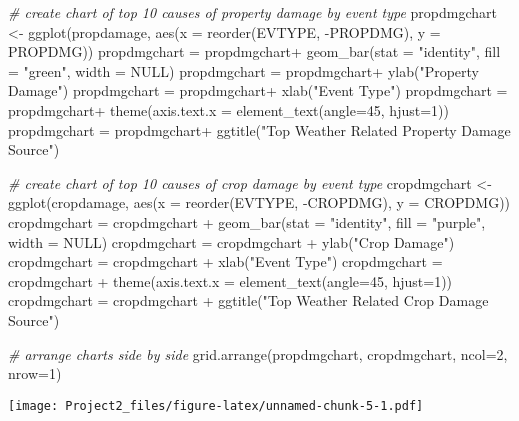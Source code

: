 \documentclass[
]{article}
\newenvironment{Shaded}{\begin{snugshade}}{\end{snugshade}}
\newcommand{\AttributeTok}[1]{\textcolor[rgb]{0.77,0.63,0.00}{#1}}
\newcommand{\CommentTok}[1]{\textcolor[rgb]{0.56,0.35,0.01}{\textit{#1}}}
\newcommand{\ConstantTok}[1]{\textcolor[rgb]{0.00,0.00,0.00}{#1}}
\newcommand{\DecValTok}[1]{\textcolor[rgb]{0.00,0.00,0.81}{#1}}
\newcommand{\FunctionTok}[1]{\textcolor[rgb]{0.00,0.00,0.00}{#1}}
\newcommand{\NormalTok}[1]{#1}
\newcommand{\OtherTok}[1]{\textcolor[rgb]{0.56,0.35,0.01}{#1}}
\newcommand{\SpecialCharTok}[1]{\textcolor[rgb]{0.00,0.00,0.00}{#1}}
\newcommand{\StringTok}[1]{\textcolor[rgb]{0.31,0.60,0.02}{#1}}
\begin{document}
\begin{Shaded}
\begin{Highlighting}[]
\CommentTok{\# create chart of top 10 causes of property damage by event type}
\NormalTok{propdmgchart }\OtherTok{\textless{}{-}} \FunctionTok{ggplot}\NormalTok{(propdamage, }\FunctionTok{aes}\NormalTok{(}\AttributeTok{x =} \FunctionTok{reorder}\NormalTok{(EVTYPE, }\SpecialCharTok{{-}}\NormalTok{PROPDMG), }\AttributeTok{y =}\NormalTok{ PROPDMG)) }
\NormalTok{propdmgchart }\OtherTok{=}\NormalTok{ propdmgchart}\SpecialCharTok{+} \FunctionTok{geom\_bar}\NormalTok{(}\AttributeTok{stat =} \StringTok{"identity"}\NormalTok{, }\AttributeTok{fill =} \StringTok{"green"}\NormalTok{, }\AttributeTok{width =} \ConstantTok{NULL}\NormalTok{)}
\NormalTok{propdmgchart }\OtherTok{=}\NormalTok{ propdmgchart}\SpecialCharTok{+} \FunctionTok{ylab}\NormalTok{(}\StringTok{"Property Damage"}\NormalTok{) }
\NormalTok{propdmgchart }\OtherTok{=}\NormalTok{ propdmgchart}\SpecialCharTok{+} \FunctionTok{xlab}\NormalTok{(}\StringTok{"Event Type"}\NormalTok{) }
\NormalTok{propdmgchart }\OtherTok{=}\NormalTok{ propdmgchart}\SpecialCharTok{+} \FunctionTok{theme}\NormalTok{(}\AttributeTok{axis.text.x =} \FunctionTok{element\_text}\NormalTok{(}\AttributeTok{angle=}\DecValTok{45}\NormalTok{, }\AttributeTok{hjust=}\DecValTok{1}\NormalTok{))}
\NormalTok{propdmgchart }\OtherTok{=}\NormalTok{ propdmgchart}\SpecialCharTok{+} \FunctionTok{ggtitle}\NormalTok{(}\StringTok{"Top Weather Related Property Damage Source"}\NormalTok{)}

\CommentTok{\# create chart of top 10 causes of crop damage by event type}
\NormalTok{cropdmgchart }\OtherTok{\textless{}{-}} \FunctionTok{ggplot}\NormalTok{(cropdamage, }\FunctionTok{aes}\NormalTok{(}\AttributeTok{x =} \FunctionTok{reorder}\NormalTok{(EVTYPE, }\SpecialCharTok{{-}}\NormalTok{CROPDMG), }\AttributeTok{y =}\NormalTok{ CROPDMG)) }
\NormalTok{cropdmgchart }\OtherTok{=}\NormalTok{ cropdmgchart }\SpecialCharTok{+} \FunctionTok{geom\_bar}\NormalTok{(}\AttributeTok{stat =} \StringTok{"identity"}\NormalTok{, }\AttributeTok{fill =} \StringTok{"purple"}\NormalTok{, }\AttributeTok{width =} \ConstantTok{NULL}\NormalTok{)}
\NormalTok{cropdmgchart }\OtherTok{=}\NormalTok{ cropdmgchart }\SpecialCharTok{+} \FunctionTok{ylab}\NormalTok{(}\StringTok{"Crop Damage"}\NormalTok{) }
\NormalTok{cropdmgchart }\OtherTok{=}\NormalTok{ cropdmgchart }\SpecialCharTok{+} \FunctionTok{xlab}\NormalTok{(}\StringTok{"Event Type"}\NormalTok{) }
\NormalTok{cropdmgchart }\OtherTok{=}\NormalTok{ cropdmgchart }\SpecialCharTok{+} \FunctionTok{theme}\NormalTok{(}\AttributeTok{axis.text.x =} \FunctionTok{element\_text}\NormalTok{(}\AttributeTok{angle=}\DecValTok{45}\NormalTok{, }\AttributeTok{hjust=}\DecValTok{1}\NormalTok{))}
\NormalTok{cropdmgchart }\OtherTok{=}\NormalTok{ cropdmgchart }\SpecialCharTok{+} \FunctionTok{ggtitle}\NormalTok{(}\StringTok{"Top Weather Related Crop Damage Source"}\NormalTok{)}

\CommentTok{\# arrange charts side by side}
\FunctionTok{grid.arrange}\NormalTok{(propdmgchart, cropdmgchart, }\AttributeTok{ncol=}\DecValTok{2}\NormalTok{, }\AttributeTok{nrow=}\DecValTok{1}\NormalTok{)}
\end{Highlighting}
\end{Shaded}

\texttt{[image: Project2\_files/figure-latex/unnamed-chunk-5-1.pdf]}
\end{document}
